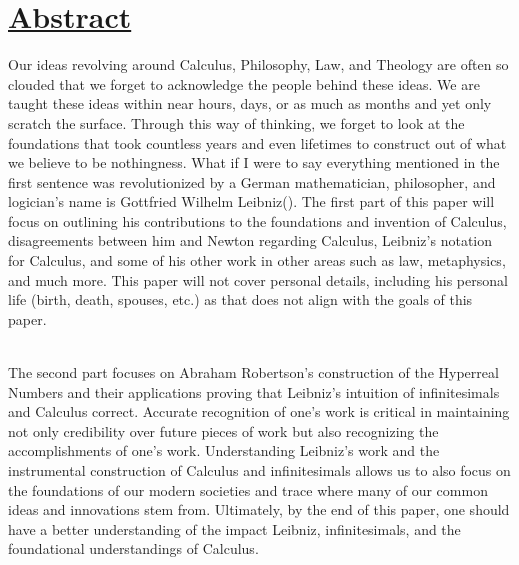 \documentclass[12pt]{report}
\begin{document}

    \newpage
{}
    \newpage



\section*{\underline{Abstract}}
Our ideas revolving around Calculus, Philosophy, Law, and Theology are often so clouded that we forget to acknowledge the people behind these ideas.
We are taught these ideas within near hours, days, or as much as months and yet only scratch the surface.
Through this way of thinking, we forget to look at the foundations that took countless years and even lifetimes to construct out of what we believe to be nothingness.
What if I were to say everything mentioned in the first sentence was revolutionized by a German mathematician, philosopher, and logician's name is Gottfried Wilhelm Leibniz().
The first part of this paper will focus on outlining his contributions to the foundations and invention of Calculus, disagreements between him and Newton regarding Calculus, Leibniz's notation for Calculus, and some of his other work in other areas such as law, metaphysics, and much more.
This paper will not cover personal details, including his personal life (birth, death, spouses, etc.) as that does not align with the goals of this paper.\par \\
The second part focuses on Abraham Robertson's construction of the Hyperreal Numbers and their applications proving that Leibniz's intuition of infinitesimals and Calculus correct.
Accurate recognition of one's work is critical in maintaining not only credibility over future pieces of work but also recognizing the accomplishments of one's work.
Understanding Leibniz's work and the instrumental construction of Calculus and infinitesimals allows us to also focus on the foundations of our modern societies and trace where many of our common ideas and innovations stem from.
Ultimately, by the end of this paper, one should have a better understanding of the impact Leibniz, infinitesimals, and the foundational understandings of Calculus.
\newpage
\end{document}
